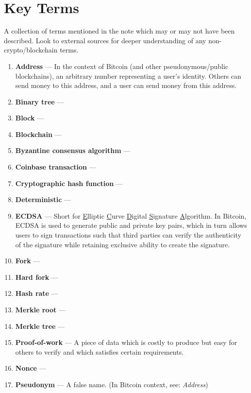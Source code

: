 \documentclass[11pt]{article}
\begin{document}
    
    
    \newpage
    \thispagestyle{firstpage}
    \vspace*{2\baselineskip}
    \section*{Key Terms}
    \noindent A collection of terms mentioned in the note which may or may not have been described. Look to external sources for deeper understanding of any non-crypto/blockchain terms.
    \begin{enumerate}
        \item \textbf{Address} --- In the context of Bitcoin (and other pseudonymous/public blockchains), an arbitrary number representing a user's identity. Others can send money to this address, and a user can send money from this address.
        \item \textbf{Binary tree} ---
        \item \textbf{Block} --- 
        \item \textbf{Blockchain} --- 
        \item \textbf{Byzantine consensus algorithm} --- 
        \item \textbf{Coinbase transaction} --- 
        \item \textbf{Cryptographic hash function} --- 
        \item \textbf{Deterministic} --- 
        \item \textbf{ECDSA} --- Short for \underline{E}lliptic \underline{C}urve \underline{D}igital \underline{S}ignature \underline{A}lgorithm. In Bitcoin, ECDSA is used to generate public and private key pairs, which in turn allows users to sign transactions such that third parties can verify the authenticity of the signature while retaining exclusive ability to create the signature.
        \item \textbf{Fork} --- 
        \item \textbf{Hard fork} --- 
        \item \textbf{Hash rate} --- 
        \item \textbf{Merkle root} --- 
        \item \textbf{Merkle tree} --- 
        \item \textbf{Proof-of-work} --- A piece of data which is costly to produce but easy for others to verify and which satisfies certain requirements.
        \item \textbf{Nonce} --- 
        \item \textbf{Pseudonym} --- A false name. (In Bitcoin context, see: \textit{Address})

\end{enumerate}
\end{document}
